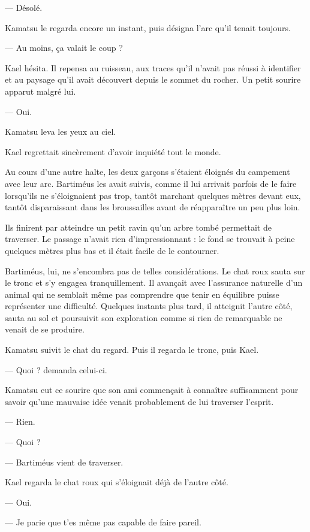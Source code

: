 — Désolé.

Kamatsu le regarda encore un instant, puis désigna l'arc qu'il tenait toujours.

— Au moins, ça valait le coup ?

Kael hésita. Il repensa au ruisseau, aux traces qu'il n'avait pas réussi à
identifier et au paysage qu'il avait découvert depuis le sommet du rocher. Un
petit sourire apparut malgré lui.

— Oui.

Kamatsu leva les yeux au ciel.

Kael regrettait sincèrement d'avoir inquiété tout le monde.

\scenebreak

Au cours d'une autre halte, les deux garçons s'étaient éloignés du campement
avec leur arc. Bartiméus les avait suivis, comme il lui arrivait parfois de le
faire lorsqu'ils ne s'éloignaient pas trop, tantôt marchant quelques mètres
devant eux, tantôt disparaissant dans les broussailles avant de réapparaître un
peu plus loin.

Ils finirent par atteindre un petit ravin qu'un arbre tombé permettait de
traverser. Le passage n'avait rien d'impressionnant : le fond se trouvait à
peine quelques mètres plus bas et il était facile de le contourner.

Bartiméus, lui, ne s'encombra pas de telles considérations. Le chat roux sauta
sur le tronc et s'y engagea tranquillement. Il avançait avec l'assurance
naturelle d'un animal qui ne semblait même pas comprendre que tenir en équilibre
puisse représenter une difficulté. Quelques instants plus tard, il atteignit
l'autre côté, sauta au sol et poursuivit son exploration comme si rien de
remarquable ne venait de se produire.

Kamatsu suivit le chat du regard. Puis il regarda le tronc, puis Kael.

— Quoi ? demanda celui-ci.

Kamatsu eut ce sourire que son ami commençait à connaître suffisamment pour
savoir qu'une mauvaise idée venait probablement de lui traverser l'esprit.

— Rien.

— Quoi ?

— Bartiméus vient de traverser.

Kael regarda le chat roux qui s'éloignait déjà de l'autre côté.

— Oui.

— Je parie que t'es même pas capable de faire pareil.

